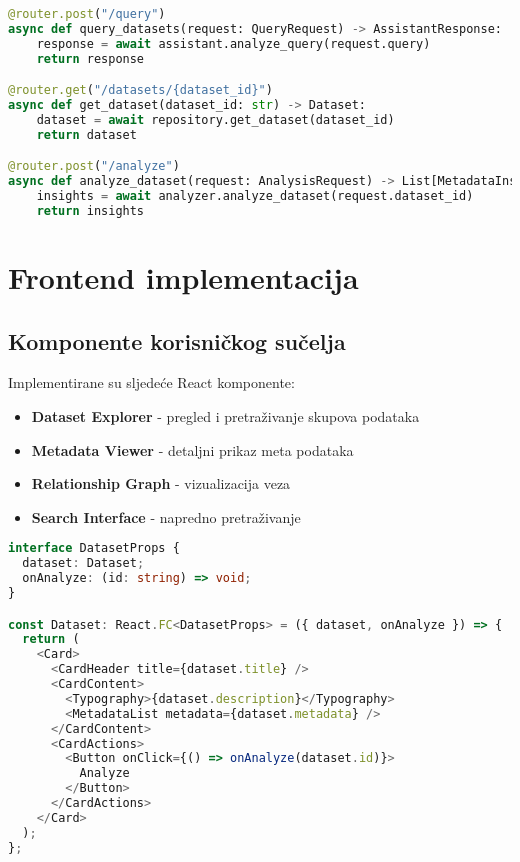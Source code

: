 \begin{lstlisting}[language=Python, caption=Implementacija glavnih API endpointa]
@router.post("/query")
async def query_datasets(request: QueryRequest) -> AssistantResponse:
    response = await assistant.analyze_query(request.query)
    return response

@router.get("/datasets/{dataset_id}")
async def get_dataset(dataset_id: str) -> Dataset:
    dataset = await repository.get_dataset(dataset_id)
    return dataset

@router.post("/analyze")
async def analyze_dataset(request: AnalysisRequest) -> List[MetadataInsight]:
    insights = await analyzer.analyze_dataset(request.dataset_id)
    return insights
\end{lstlisting}

\section{Frontend implementacija}
\label{sec:frontend}

\subsection{Komponente korisničkog sučelja}
Implementirane su sljedeće React komponente:
\begin{itemize}
    \item \textbf{Dataset Explorer} - pregled i pretraživanje skupova podataka
    \item \textbf{Metadata Viewer} - detaljni prikaz meta podataka
    \item \textbf{Relationship Graph} - vizualizacija veza
    \item \textbf{Search Interface} - napredno pretraživanje
\end{itemize}

\begin{lstlisting}[language=TypeScript, caption=Implementacija Dataset komponente]
interface DatasetProps {
  dataset: Dataset;
  onAnalyze: (id: string) => void;
}

const Dataset: React.FC<DatasetProps> = ({ dataset, onAnalyze }) => {
  return (
    <Card>
      <CardHeader title={dataset.title} />
      <CardContent>
        <Typography>{dataset.description}</Typography>
        <MetadataList metadata={dataset.metadata} />
      </CardContent>
      <CardActions>
        <Button onClick={() => onAnalyze(dataset.id)}>
          Analyze
        </Button>
      </CardActions>
    </Card>
  );
};
\end{lstlisting}

